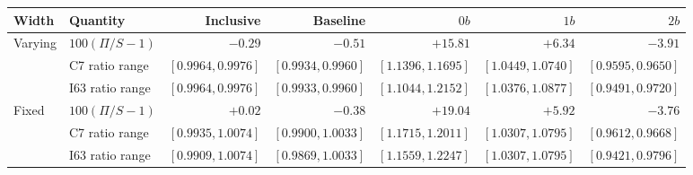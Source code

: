 \begin{tabular}{llrrrrr}
\toprule
Width & Quantity & Inclusive & Baseline & $0b$ & $1b$ & $2b$ \\
\midrule
Varying & $100(\Pi/S-1)$ & $-0.29$ & $-0.51$ & $+15.81$ & $+6.34$ & $-3.91$ \\
 & C7 ratio range & $[0.9964,0.9976]$ & $[0.9934,0.9960]$ & $[1.1396,1.1695]$ & $[1.0449,1.0740]$ & $[0.9595,0.9650]$ \\
 & I63 ratio range & $[0.9964,0.9976]$ & $[0.9933,0.9960]$ & $[1.1044,1.2152]$ & $[1.0376,1.0877]$ & $[0.9491,0.9720]$ \\
Fixed & $100(\Pi/S-1)$ & $+0.02$ & $-0.38$ & $+19.04$ & $+5.92$ & $-3.76$ \\
 & C7 ratio range & $[0.9935,1.0074]$ & $[0.9900,1.0033]$ & $[1.1715,1.2011]$ & $[1.0307,1.0795]$ & $[0.9612,0.9668]$ \\
 & I63 ratio range & $[0.9909,1.0074]$ & $[0.9869,1.0033]$ & $[1.1559,1.2247]$ & $[1.0307,1.0795]$ & $[0.9421,0.9796]$ \\
\bottomrule
\end{tabular}
